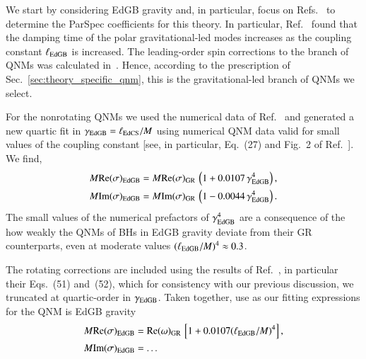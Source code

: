 \documentclass[twocolumn,
               prd,
               aps,
               superscriptaddress,
               tightenlines,
               nofootinbib,
               eqsecnum,
               amsfonts,
               amsmath,
               longbibliography]{revtex4-1}
\begin{document}
We start by considering EdGB gravity and, in particular, focus on
Refs.~\cite{Blazquez-Salcedo:2016enn,Pierini:2021jxd} to determine the
ParSpec coefficients for this theory.
%
In particular, Ref.~\cite{Blazquez-Salcedo:2016enn} found that the damping time
of the polar gravitational-led modes increases as the coupling constant
$\ell_{\rm EdGB}$ is increased. The leading-order spin corrections to the
branch of QNMs was calculated in~\cite{Pierini:2021jxd}.
%
Hence, according to the prescription of Sec.~\ref{sec:theory_specific_qnm},
this is the gravitational-led branch of QNMs we select.

For the nonrotating QNMs we used the numerical data of Ref.~\cite{Blazquez-Salcedo:2016enn} and
generated a new quartic fit in $\gamma_{\rm EdGB} = \ell_{\rm EdCS} / M$ using numerical QNM data valid for small
values of the coupling constant [see, in particular, Eq.~(27) and Fig.~2 of Ref.~\cite{Blazquez-Salcedo:2016enn}].
%
We find,
%
\begin{subequations}
\begin{align}
    M {\rm Re}(\sigma)_{\rm EdGB} &= M {\rm Re}(\sigma)_{\rm GR} \, \left( 1 + 0.0107 \, \gamma_{\rm EdGB}^4 \right),
    \\
    M {\rm Im}(\sigma)_{\rm EdGB} &= M {\rm Im}(\sigma)_{\rm GR} \, \left( 1 - 0.0044 \, \gamma_{\rm EdGB}^4 \right).
\end{align}
\end{subequations}
%
The small values of the numerical prefactors of $\gamma_{\rm EdGB}^4$ are a consequence of the how weakly the QNMs
of BHs in EdGB gravity deviate from their GR counterparts, even at moderate values $(\ell_{\rm EdGB} / M)^4 \approx 0.3$.

The rotating corrections are included using the results of Ref.~\cite{Pierini:2021jxd}, in particular their Eqs.~(51) and~(52),
which for consistency with our previous discussion, we truncated at quartic-order in $\gamma_{\rm EdGB}$.
%
Taken together, use as our fitting expressions for the QNM is EdGB gravity
%
\begin{subequations}
\begin{align}
    M {\rm Re}(\sigma)_{\rm EdGB} &= {\rm Re}(\omega)_{\rm GR} \, \left[ 1 + 0.0107 (\ell_{\rm EdGB} / M)^4 \right],
    \\
    M {\rm Im}(\sigma)_{\rm EdGB} &= \dots %
\end{align}
\end{subequations}
\end{document}
